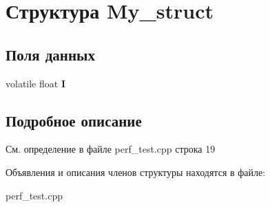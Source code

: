 \hypertarget{struct_my__struct}{\section{Структура \-My\-\_\-struct}
\label{struct_my__struct}
}
\subsection*{Поля данных}
\begin{DoxyCompactItemize}
\item 
\hypertarget{struct_my__struct_a8ea34b2e963fe95ccac1975beb7fff6a}{volatile float {\bfseries \-I}}\label{struct_my__struct_a8ea34b2e963fe95ccac1975beb7fff6a}

\end{DoxyCompactItemize}


\subsection{Подробное описание}


См. определение в файле perf\-\_\-test.\-cpp строка 19



Объявления и описания членов структуры находятся в файле\-:\begin{DoxyCompactItemize}
\item 
perf\-\_\-test.\-cpp\end{DoxyCompactItemize}

